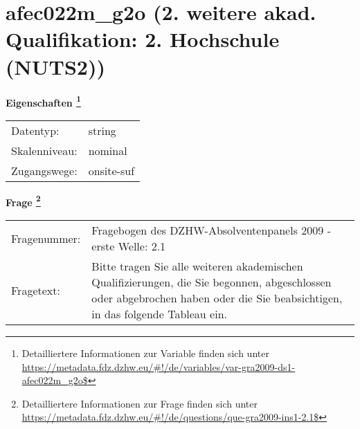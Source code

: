 
    \setcounter{footnote}{0}

    \vspace*{-1.8cm}
	\section{afec022m\_g2o (2. weitere akad. Qualifikation: 2. Hochschule (NUTS2))}
	\label{section:afec022m_g2o}



    \vspace*{0.5cm}
    \noindent\textbf{Eigenschaften
	\footnote{Detailliertere Informationen zur Variable finden sich unter
		\url{https://metadata.fdz.dzhw.eu/\#!/de/variables/var-gra2009-ds1-afec022m_g2o$}}}\\
	\begin{tabularx}{\hsize}{@{}lX}
	Datentyp: & string \\
	Skalenniveau: & nominal \\
	Zugangswege: &
	  onsite-suf
 \\
    \end{tabularx}



				\vspace*{0.5cm}
                \noindent\textbf{Frage
	                \footnote{Detailliertere Informationen zur Frage finden sich unter
		              \url{https://metadata.fdz.dzhw.eu/\#!/de/questions/que-gra2009-ins1-2.1$}}}\\
				\begin{tabularx}{\hsize}{@{}lX}
					Fragenummer: &
					  Fragebogen des DZHW-Absolventenpanels 2009 - erste Welle:
					  2.1
 \\
					Fragetext: & Bitte tragen Sie alle weiteren akademischen Qualifizierungen, die Sie begonnen, abgeschlossen oder abgebrochen haben oder die Sie beabsichtigen, in das folgende Tableau ein. \\
				\end{tabularx}





